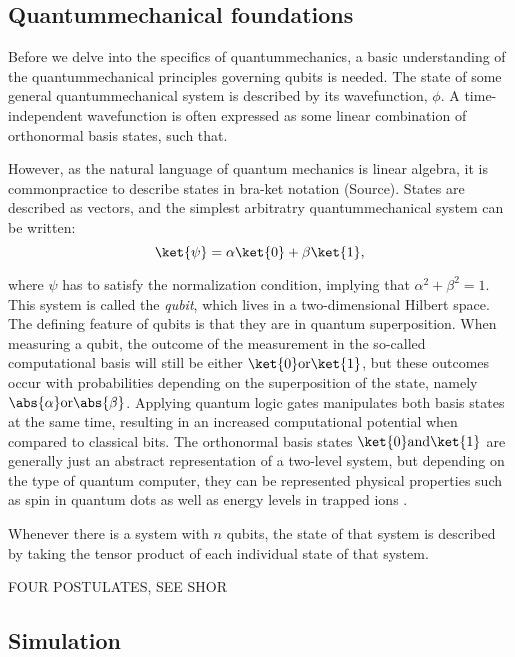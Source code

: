 


\subsection{Quantummechanical foundations}

Before we delve into the specifics of quantummechanics, a basic understanding of the quantummechanical principles governing qubits is needed. The state of some general quantummechanical system is described by its wavefunction, $\phi$. A time-independent wavefunction is often expressed as some linear combination of orthonormal basis states, such that.


However, as the natural language of quantum mechanics is linear algebra, it is commonpractice to describe states in bra-ket notation (Source). States are described as vectors, and the simplest arbitratry quantummechanical system can be written:
$$\ket{\psi} = \alpha \ket{0} + \beta \ket{1},$$

where $\psi$ has to satisfy the normalization condition, implying that $\alpha^2 + \beta^2 = 1$. This system is called the \textit{qubit}, which lives in a two-dimensional Hilbert space. The defining feature of qubits is that they are in quantum superposition. When measuring a qubit, the outcome of the measurement in the so-called computational basis will still be either $\ket{0} \text{or} \ket{1}$, but these outcomes occur with probabilities depending on the superposition of the state, namely $\abs{\alpha} \text{or} \abs{\beta}$. Applying quantum logic gates manipulates both basis states at the same time, resulting in an increased computational potential when compared to classical bits. The orthonormal basis states $\ket{0} \text{and} \ket{1}$ are generally just an abstract representation of a two-level system, but depending on the type of quantum computer, they can be represented physical properties such as spin in quantum dots as well as energy levels in trapped ions \cite{mcardle}.

Whenever there is a system with $n$ qubits, the state of that system is described by taking the tensor product of each individual state of that system.

FOUR POSTULATES, SEE SHOR


\subsection{Simulation}

